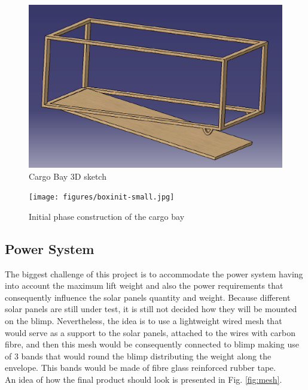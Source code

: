 \begin{figure}[bht]
\centering
\includegraphics[scale=0.5]{figures/box.png}
\caption{Cargo Bay 3D sketch}
\label{fig:box}
\end{figure}

\begin{figure}[bht]
\centering
\texttt{[image: figures/boxinit-small.jpg]}
\caption{Initial phase construction of the cargo bay}
\label{fig:boxinit}
\end{figure}

\subsection{Power System}

The biggest challenge of this project is to accommodate the power system having into account the maximum lift weight and also the power requirements that consequently influence the solar panels quantity and weight. Because different solar panels are still under test, it is still not decided how they will be mounted on the blimp. Nevertheless, the idea is to use a lightweight wired mesh that would serve as a support to the solar panels, attached to the wires with carbon fibre, and then this mesh would be consequently connected to blimp making use of 3 bands that would round the blimp distributing the weight along the envelope. This bands would be made of fibre glass reinforced rubber tape. \\
An idea of how the final product should look is presented in Fig. \ref{fig:mesh}.

